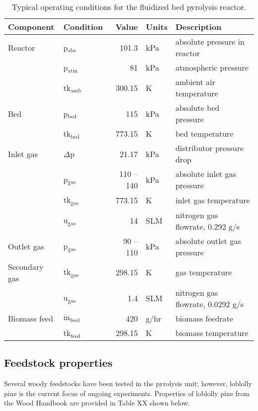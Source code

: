 \begin{table}[H]
    \centering
    \caption{Typical operating conditions for the fluidized bed pyrolysis reactor.}
    \label{tab:operating}
    \begin{tabular}{llrll}
        \toprule
        Component & Condition & Value & Units & Description \\
        \midrule
        Reactor
            & p$_\textrm{abs}$ & 101.3 & kPa & absolute pressure in reactor \\
            & p$_\textrm{atm}$ & 81 & kPa & atmospheric pressure \\
            & tk$_\textrm{amb}$ & 300.15 & K & ambient air temperature \\
        Bed
            & p$_\textrm{bed}$ & 115 & kPa & absolute bed pressure \\
            & tk$_\textrm{bed}$ & 773.15 & K & bed temperature \\
        Inlet gas
            & $\Delta$p & 21.17 & kPa & distributor pressure drop \\
            & p$_\textrm{gas}$ & 110 -- 140 & kPa & absolute inlet gas pressure \\
            & tk$_\textrm{gas}$ & 773.15 & K & inlet gas temperature \\
            & u$_\textrm{gas}$ & 14 & SLM & nitrogen gas flowrate, 0.292 g/s \\
        Outlet gas
            & p$_\textrm{gas}$ & 90 -- 110 & kPa & absolute outlet gas pressure \\
        Secondary gas
            & tk$_\textrm{gas}$ & 298.15 & K & gas temperature \\
            & u$_\textrm{gas}$ & 1.4 & SLM & nitrogen gas flowrate, 0.0292 g/s \\
        Biomass feed
            & $\dot{\textrm{m}}_\textrm{feed}$ & 420 & g/hr & biomass feedrate \\
            & tk$_\textrm{feed}$ & 298.15 & K & biomass temperature \\
        \bottomrule
    \end{tabular}
\end{table}

\subsection{Feedstock properties}

Several woody feedstocks have been tested in the pyrolysis unit; however, loblolly pine is the current focus of ongoing experiments. Properties of loblolly pine from the Wood Handbook are provided in Table XX shown below.

